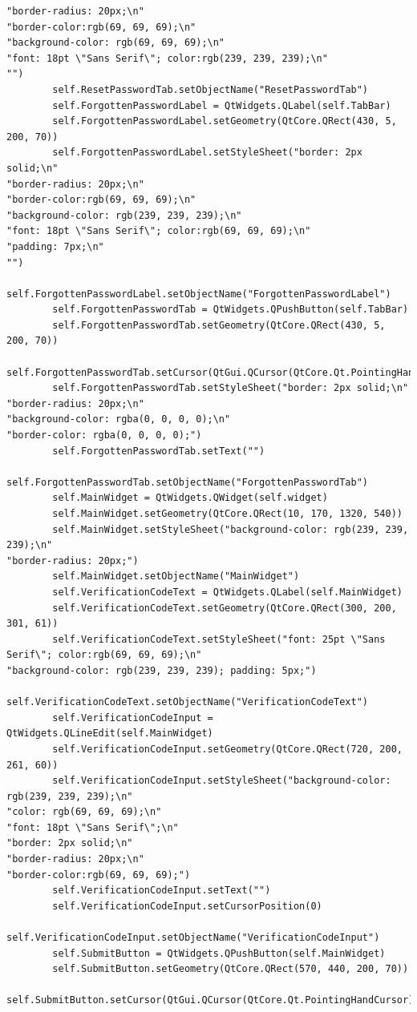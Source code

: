 \documentclass{article}
\begin{document}
\begin{lstlisting}
"border-radius: 20px;\n"
"border-color:rgb(69, 69, 69);\n"
"background-color: rgb(69, 69, 69);\n"
"font: 18pt \"Sans Serif\"; color:rgb(239, 239, 239);\n"
"")
        self.ResetPasswordTab.setObjectName("ResetPasswordTab")
        self.ForgottenPasswordLabel = QtWidgets.QLabel(self.TabBar)
        self.ForgottenPasswordLabel.setGeometry(QtCore.QRect(430, 5, 200, 70))
        self.ForgottenPasswordLabel.setStyleSheet("border: 2px solid;\n"
"border-radius: 20px;\n"
"border-color:rgb(69, 69, 69);\n"
"background-color: rgb(239, 239, 239);\n"
"font: 18pt \"Sans Serif\"; color:rgb(69, 69, 69);\n"
"padding: 7px;\n"
"")
        self.ForgottenPasswordLabel.setObjectName("ForgottenPasswordLabel")
        self.ForgottenPasswordTab = QtWidgets.QPushButton(self.TabBar)
        self.ForgottenPasswordTab.setGeometry(QtCore.QRect(430, 5, 200, 70))
        self.ForgottenPasswordTab.setCursor(QtGui.QCursor(QtCore.Qt.PointingHandCursor))
        self.ForgottenPasswordTab.setStyleSheet("border: 2px solid;\n"
"border-radius: 20px;\n"
"background-color: rgba(0, 0, 0, 0);\n"
"border-color: rgba(0, 0, 0, 0);")
        self.ForgottenPasswordTab.setText("")
        self.ForgottenPasswordTab.setObjectName("ForgottenPasswordTab")
        self.MainWidget = QtWidgets.QWidget(self.widget)
        self.MainWidget.setGeometry(QtCore.QRect(10, 170, 1320, 540))
        self.MainWidget.setStyleSheet("background-color: rgb(239, 239, 239);\n"
"border-radius: 20px;")
        self.MainWidget.setObjectName("MainWidget")
        self.VerificationCodeText = QtWidgets.QLabel(self.MainWidget)
        self.VerificationCodeText.setGeometry(QtCore.QRect(300, 200, 301, 61))
        self.VerificationCodeText.setStyleSheet("font: 25pt \"Sans Serif\"; color:rgb(69, 69, 69);\n"
"background-color: rgb(239, 239, 239); padding: 5px;")
        self.VerificationCodeText.setObjectName("VerificationCodeText")
        self.VerificationCodeInput = QtWidgets.QLineEdit(self.MainWidget)
        self.VerificationCodeInput.setGeometry(QtCore.QRect(720, 200, 261, 60))
        self.VerificationCodeInput.setStyleSheet("background-color: rgb(239, 239, 239);\n"
"color: rgb(69, 69, 69);\n"
"font: 18pt \"Sans Serif\";\n"
"border: 2px solid;\n"
"border-radius: 20px;\n"
"border-color:rgb(69, 69, 69);")
        self.VerificationCodeInput.setText("")
        self.VerificationCodeInput.setCursorPosition(0)
        self.VerificationCodeInput.setObjectName("VerificationCodeInput")
        self.SubmitButton = QtWidgets.QPushButton(self.MainWidget)
        self.SubmitButton.setGeometry(QtCore.QRect(570, 440, 200, 70))
        self.SubmitButton.setCursor(QtGui.QCursor(QtCore.Qt.PointingHandCursor))

\end{lstlisting}
\end{document}
